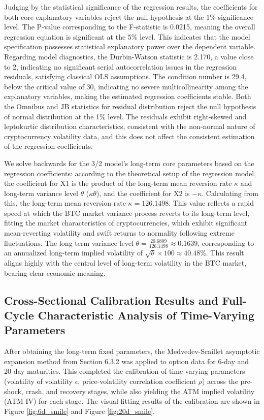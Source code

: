 Judging by the statistical significance of the regression results, the coefficients for both core explanatory variables reject the null hypothesis at the 1\% significance level. The P-value corresponding to the F-statistic is 0.0215, meaning the overall regression equation is significant at the 5\% level. This indicates that the model specification possesses statistical explanatory power over the dependent variable. Regarding model diagnostics, the Durbin-Watson statistic is 2.170, a value close to 2, indicating no significant serial autocorrelation issues in the regression residuals, satisfying classical OLS assumptions. The condition number is 29.4, below the critical value of 30, indicating no severe multicollinearity among the explanatory variables, making the estimated regression coefficients stable. Both the Omnibus and JB statistics for residual distribution reject the null hypothesis of normal distribution at the 1\% level. The residuals exhibit right-skewed and leptokurtic distribution characteristics, consistent with the non-normal nature of cryptocurrency volatility data, and this does not affect the consistent estimation of the regression coefficients.

We solve backwards for the 3/2 model's long-term core parameters based on the regression coefficients: according to the theoretical setup of the regression model, the coefficient for X1 is the product of the long-term mean reversion rate $\kappa$ and long-term variance level $\theta$ ($\kappa\theta$), and the coefficient for X2 is $-\kappa$. Calculating from this, the long-term mean reversion rate $\kappa = 126.1498$. This value reflects a rapid speed at which the BTC market variance process reverts to its long-term level, fitting the market characteristics of cryptocurrencies, which exhibit significant mean-reverting volatility and swift returns to normality following extreme fluctuations. The long-term variance level $\theta = \frac{20.6809}{126.1498} \approx 0.1639$, corresponding to an annualized long-term implied volatility of $\sqrt{\theta} \times 100 \approx 40.48\%$. This result aligns highly with the central level of long-term volatility in the BTC market, bearing clear economic meaning.

\subsection{Cross-Sectional Calibration Results and Full-Cycle Characteristic Analysis of Time-Varying Parameters}

After obtaining the long-term fixed parameters, the Medvedev-Scaillet asymptotic expansion method from Section 6.3.2 was applied to option data for 6-day and 20-day maturities. This completed the calibration of time-varying parameters (volatility of volatility $\epsilon$, price-volatility correlation coefficient $\rho$) across the pre-shock, crash, and recovery stages, while also yielding the ATM implied volatility (ATM IV) for each stage. The visual fitting results of the calibration are shown in Figure \ref{fig:6d_smile} and Figure \ref{fig:20d_smile}.

